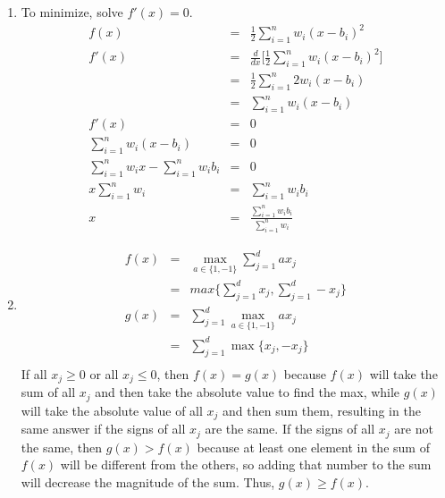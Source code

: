 \documentclass[12pt]{article}
\begin{document}
\begin{enumerate}[label=(\alph*)]

  \item To minimize, solve $f'(x) = 0$.
  \begin{eqnarray*}
  f(x) &=& \frac{1}{2}\displaystyle\sum\limits_{i=1}^n w_i (x-b_i)^2\\
  f'(x) &=& \frac{d}{dx}\biggl[\frac{1}{2}\displaystyle\sum\limits_{i=1}^n w_i (x-b_i)^2\biggr]\\
  &=& \frac{1}{2}\displaystyle\sum\limits_{i=1}^n 2w_i (x-b_i)\\
  &=& \displaystyle\sum\limits_{i=1}^n w_i (x-b_i)\\
  f'(x) &=& 0\\
  \displaystyle\sum\limits_{i=1}^n w_i (x-b_i) &=& 0\\
  \displaystyle\sum\limits_{i=1}^n w_i x - \displaystyle\sum\limits_{i=1}^n w_i b_i &=& 0\\
  x \displaystyle\sum\limits_{i=1}^n w_i &=& \displaystyle\sum\limits_{i=1}^n w_i b_i\\
  x &=& \frac{\sum_{i=1}^n w_i b_i}{\sum_{i=1}^n w_i}
  \end{eqnarray*}

  \item 
  \begin{eqnarray*}
  f(x) &=& \max_{a \in \lbrace1, -1\rbrace} \displaystyle\sum\limits_{j=1}^d ax_j\\
  &=& max \biggl\lbrace \displaystyle\sum\limits_{j=1}^d x_j , \displaystyle\sum\limits_{j=1}^d -x_j \biggr\rbrace\\
  g(x) &=& \displaystyle\sum\limits_{j=1}^d \max_{a \in \{1,-1\}} a x_j\\
  &=& \displaystyle\sum\limits_{j=1}^d \max \biggl\lbrace x_j , -x_j \biggr\rbrace\\
  \end{eqnarray*}
  If all $x_j \ge 0$ or all $x_j \le 0$, then $f(x) = g(x)$ because $f(x)$ will take the sum of all $x_j$ and then take the absolute value to find the max, while $g(x)$ will take the absolute value of all $x_j$ and then sum them, resulting in the same answer if the signs of all $x_j$ are the same. If the signs of all $x_j$ are not the same, then $g(x) > f(x)$ because at least one element in the sum of $f(x)$ will be different from the others, so adding that number to the sum will decrease the magnitude of the sum. Thus, $g(x) \ge f(x)$.


\end{enumerate}
\end{document}
